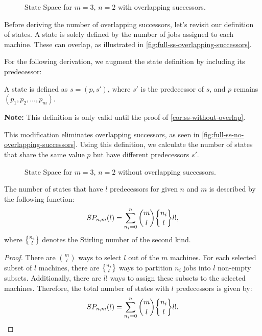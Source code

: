 \begin{figure}
    \centering
    
    \caption{State Space for $m=3$, $n=2$ with overlapping successors.}
    \label{fig:full-ss-overlapping-successors}
\end{figure}

Before deriving the number of overlapping successors, let's revisit our definition of states. A state is solely defined by the number of jobs assigned to each machine. These can overlap, as illustrated in \autoref{fig:full-ss-overlapping-successors}.

For the following derivation, we augment the state definition by including its predecessor:

\begin{definition} \label{def:state-with-predecessor}
    A state is defined as $s = (p, s')$, where $s'$ is the predecessor of $s$, and $p$ remains $(p_1, p_2, \dots, p_m)$.
    
    \textbf{Note:} This definition is only valid until the proof of \autoref{cor:ss-without-overlap}.
\end{definition}

This modification eliminates overlapping successors, as seen in \autoref{fig:full-ss-no-overlapping-successors}. Using this definition, we calculate the number of states that share the same value $p$ but have different predecessors $s'$.

\begin{figure}
    \centering
    
    \caption{State Space for $m=3$, $n=2$ without overlapping successors.}
    \label{fig:full-ss-no-overlapping-successors}
\end{figure}

\begin{proposition} \label{prop:sp}
    The number of states that have $l$ predecessors for given $n$ and $m$ is described by the following function:
    \[
        SP_{n,m}(l) = \sum_{n_i=0}^{n} \binom{m}{l} \stirlingS{n_i}{l} l!\text{,}
    \]
    where $\stirlingS{n_i}{l}$ denotes the Stirling number of the second kind.
\end{proposition}

\begin{proof}
    There are $\binom{m}{l}$ ways to select $l$ out of the $m$ machines. For each selected subset of $l$ machines, there are $\stirlingS{n_i}{l}$ ways to partition $n_i$ jobs into $l$ non-empty subsets. Additionally, there are $l!$ ways to assign these subsets to the selected machines. Therefore, the total number of states with $l$ predecessors is given by:
    \[
        SP_{n,m}(l) = \sum_{n_i=0}^{n} \binom{m}{l} \stirlingS{n_i}{l} l!\text{.}
    \]
\end{proof}

